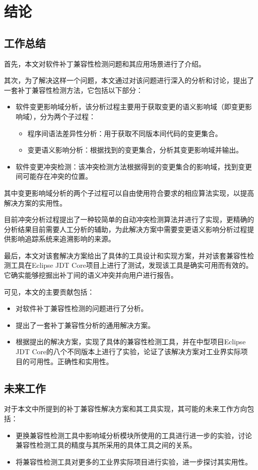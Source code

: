 \chapter{结论}
\section{工作总结}

首先，本文对软件补丁兼容性检测问题和其应用场景进行了介绍。

其次，为了解决这样一个问题，本文通过对该问题进行深入的分析和讨论，提出了一套补丁兼容性检测方法，它包括以下部分：
\begin{itemize}
	\item 软件变更影响域分析，该分析过程主要用于获取变更的语义影响域（即变更影响域），分为两个子过程：
	\begin{itemize}
		\item 程序间语法差异性分析：用于获取不同版本间代码的变更集合。
		\item 变更语义影响分析：根据找到的变更集合，分析其变更影响域并输出。
	\end{itemize}
	\item 软件变更冲突检测：该冲突检测方法根据得到的变更集合的影响域，找到变更间可能存在冲突的位置。
\end{itemize}

其中变更影响域分析的两个子过程可以自由使用符合要求的相应算法实现，以提高解决方案的实用性。

目前冲突分析过程提出了一种较简单的自动冲突检测算法并进行了实现，更精确的分析结果目前需要人工分析的辅助，为此解决方案中需要变更语义影响分析过程提供影响追踪系统来追溯影响的来源。

最后，本文对该套解决方案给出了具体的工具设计和实现方案，并对该套兼容性检测工具在Eclipse JDT Core项目上进行了测试，发现该工具是确实可用而有效的。它确实能够挖掘出补丁间的语义冲突并向用户进行报告。

可见，本文的主要贡献包括：
\begin{itemize}
	\item 对软件补丁兼容性检测的问题进行了分析。
	\item 提出了一套补丁兼容性分析的通用解决方案。
	\item 根据提出的解决方案，实现了具体的兼容性检测工具，并在中型项目Eclipse JDT Core的八个不同版本上进行了实验，论证了该解决方案对工业界实际项目的可用性。正确性和实用性。
\end{itemize}

\section{未来工作}

对于本文中所提到的补丁兼容性解决方案和其工具实现，其可能的未来工作方向包括：
\begin{itemize}
	\item 更换兼容性检测工具中影响域分析模块所使用的工具进行进一步的实验，讨论兼容性检测工具的精度与其所采用的具体工具之间的关系。
	\item 将兼容性检测工具对更多的工业界实际项目进行实验，进一步探讨其实用性。
\end{itemize}